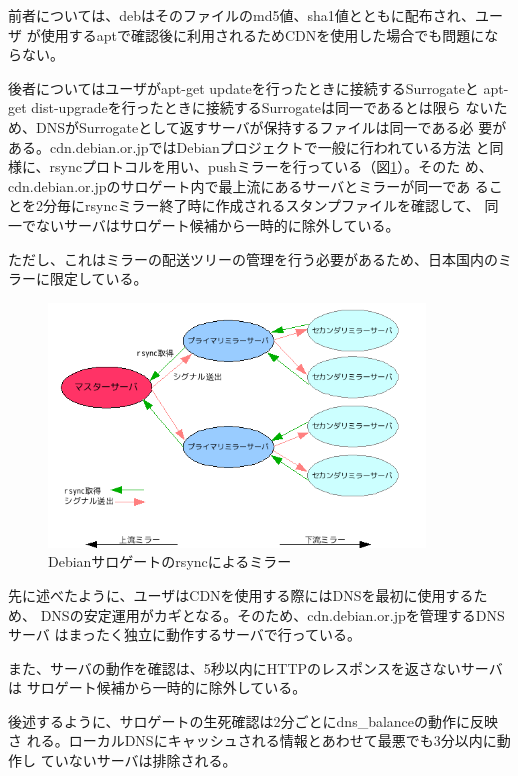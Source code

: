 \documentclass[mingoth,a4paper]{jsarticle}
\begin{document}
前者については、debはそのファイルのmd5値、sha1値とともに配布され、ユーザ
が使用するaptで確認後に利用されるためCDNを使用した場合でも問題にならない。

後者についてはユーザがapt-get updateを行ったときに接続するSurrogateと
apt-get dist-upgradeを行ったときに接続するSurrogateは同一であるとは限ら
ないため、DNSがSurrogateとして返すサーバが保持するファイルは同一である必
要がある。cdn.debian.or.jpではDebianプロジェクトで一般に行われている方法
と同様に、rsyncプロトコルを用い、pushミラーを行っている（図\ref{fig:cdn-rsync}）。そのた
め、cdn.debian.or.jpのサロゲート内で最上流にあるサーバとミラーが同一であ
ることを2分毎にrsyncミラー終了時に作成されるスタンプファイルを確認して、
同一でないサーバはサロゲート候補から一時的に除外している。

ただし、これはミラーの配送ツリーの管理を行う必要があるため、日本国内のミ
ラーに限定している。

\begin{figure}[htbp]
 \begin{center}
  \includegraphics[width=100mm]{image200810/cdn-rsync.png}
 \end{center}
 \caption{Debianサロゲートのrsyncによるミラー}
 \label{fig:cdn-rsync}
\end{figure}


先に述べたように、ユーザはCDNを使用する際にはDNSを最初に使用するため、
DNSの安定運用がカギとなる。そのため、cdn.debian.or.jpを管理するDNSサーバ
はまったく独立に動作するサーバで行っている。

また、サーバの動作を確認は、5秒以内にHTTPのレスポンスを返さないサーバは
サロゲート候補から一時的に除外している。

後述するように、サロゲートの生死確認は2分ごとにdns\_balanceの動作に反映さ
れる。ローカルDNSにキャッシュされる情報とあわせて最悪でも3分以内に動作し
ていないサーバは排除される。
\end{document}
